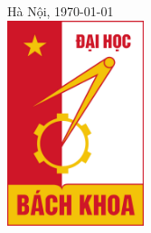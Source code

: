 \documentclass[../report.tex]{subfiles}
\begin{document}
\begin{titlepage}
{\large Hà Nội, \today}\\[1cm] %

\includegraphics[width=4cm]{figures/hust.jpg}\\[1cm] %
 

\vfill %

\end{titlepage}
\end{document}
